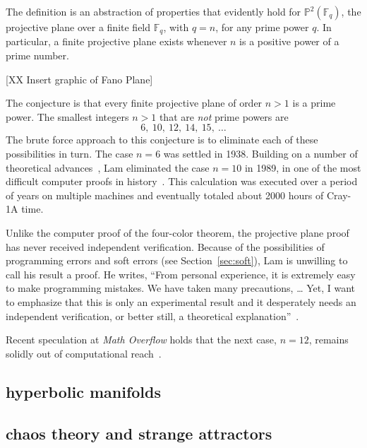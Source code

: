 \documentclass{llncs}
\newcommand{\ring}[1]{\mathbb{#1}}
\begin{document}
The definition is an abstraction of properties that evidently
hold for $\ring{P}^2(\ring{F}_q)$, the projective plane over a finite
field $\ring{F}_q$, with $q=n$, for any prime power $q$.  In
particular, a finite projective plane exists whenever $n$ is a positive power of a prime
number.

[XX Insert graphic of Fano Plane]

The conjecture is that every finite projective plane
of order $n>1$ is a prime power.  The smallest integers $n>1$
that are {\it not} prime powers are
\[
6,~10,~12,~14,~15,~\dots
\]
The brute force approach to this conjecture is to eliminate each of
these possibilities in turn.  The case $n=6$ was settled in 1938.
Building on a number of theoretical advances~\cite{MST}, Lam eliminated the case
$n=10$ in 1989, in one of the most difficult computer proofs in
history~\cite{Lam89}.  This calculation was executed over
a period of years on multiple machines and eventually totaled about 2000
hours of Cray-1A time.  

Unlike the computer proof of the four-color theorem, the
projective plane proof has never received independent verification.
Because of the possibilities of programming errors and soft errors
(see Section~\ref{sec:soft}), Lam is unwilling to call his result a
proof.  He writes, ``From personal experience, it is extremely easy to
make programming mistakes. We have taken many precautions, 
\dots
Yet, I want to emphasize that this is only an
experimental result and it desperately needs an independent
verification, or better still, a theoretical
explanation''~\cite{LamS}.


Recent speculation at {\it Math Overflow} holds that the next case,
$n=12$, remains solidly out of computational reach~\cite{Horn}.



\subsection{hyperbolic manifolds}


\subsection{chaos theory and strange attractors}
\end{document}
